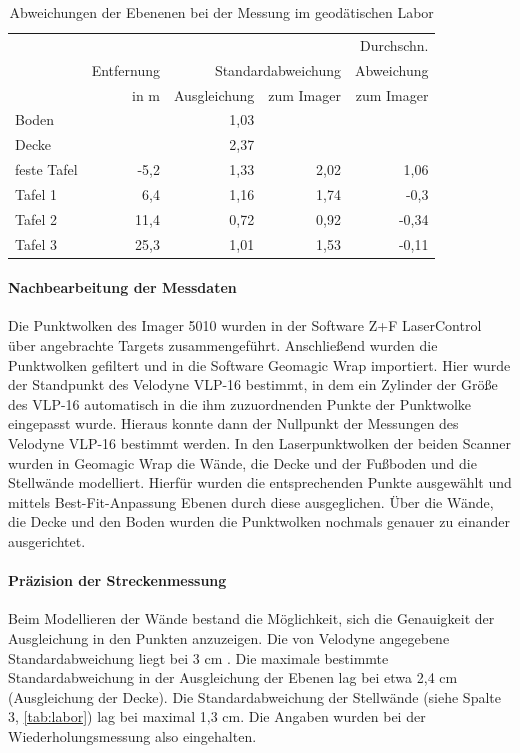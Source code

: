 \documentclass[a4paper,12pt,bibliography=totoc, listof=totoc,titlepage,pointlessnumbers]{scrreprt}
\begin{document}
\begin{table}[!ht]
\centering
\begin{tabular}{|l|r|r|r|r|}
\cline{2-4}
\hline
		& 		& \multicolumn{2}{r|}{} 	&  Durchschn.\\
		& Entfernung	& \multicolumn{2}{r|}{Standardabweichung} & Abweichung\\
		& in m		& Ausgleichung	& zum Imager 	& zum Imager \\ \hline
Boden		&		& 1,03		&		& 	\\ \hline
Decke		& 	    	& 2,37		&		& 	\\ \hline
feste Tafel	& -5,2		& 1,33		& 2,02		& 1,06	\\ \hline
Tafel 1		& 6,4      	& 1,16		& 1,74		& -0,3	\\ \hline
Tafel 2		& 11,4     	& 0,72		& 0,92		& -0,34	\\ \hline
Tafel 3		& 25,3     	& 1,01		& 1,53		& -0,11	\\ \hline
\end{tabular}
\caption{Abweichungen der Ebenenen bei der Messung im geodätischen Labor}
\label{tab:labor}
\end{table}

\paragraph{Nachbearbeitung der Messdaten}
Die Punktwolken des Imager 5010 wurden in der Software Z+F LaserControl über angebrachte Targets zusammengeführt. Anschließend wurden die Punktwolken gefiltert und in die Software Geomagic Wrap importiert. Hier wurde der Standpunkt des Velodyne VLP-16 bestimmt, in dem ein Zylinder der Größe des VLP-16 automatisch in die ihm zuzuordnenden Punkte der Punktwolke eingepasst wurde.  Hieraus konnte dann der Nullpunkt der Messungen des Velodyne VLP-16 bestimmt werden.
In den Laserpunktwolken der beiden Scanner wurden in Geomagic Wrap die Wände, die Decke und der Fußboden und die Stellwände modelliert. Hierfür wurden die entsprechenden Punkte ausgewählt und mittels Best-Fit-Anpassung Ebenen durch diese ausgeglichen. Über die Wände, die Decke und den Boden wurden die Punktwolken nochmals genauer zu einander ausgerichtet.

\paragraph{Präzision der Streckenmessung}
Beim Modellieren der Wände bestand die Möglichkeit, sich die Genauigkeit der Ausgleichung in den Punkten anzuzeigen. Die von Velodyne angegebene Standardabweichung liegt bei 3 cm \citep{vlpSheet}. Die maximale bestimmte Standardabweichung in der Ausgleichung der Ebenen lag bei etwa 2,4 cm (Ausgleichung der Decke). Die Standardabweichung der Stellwände (siehe Spalte 3, \autoref{tab:labor}) lag bei maximal 1,3 cm. Die Angaben wurden bei der Wiederholungsmessung also eingehalten.
\end{document}
